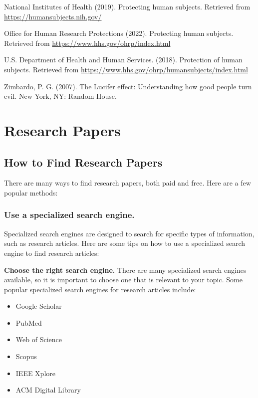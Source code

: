 \documentclass[
  b5paper]{book}
\begin{document}
National Institutes of Health (2019). Protecting human subjects. Retrieved from \url{https://humansubjects.nih.gov/}

Office for Human Research Protections (2022). Protecting human subjects. Retrieved from \url{https://www.hhs.gov/ohrp/index.html}

U.S. Department of Health and Human Services. (2018). Protection of human subjects. Retrieved from \url{https://www.hhs.gov/ohrp/humansubjects/index.html}

Zimbardo, P. G. (2007). The Lucifer effect: Understanding how good people turn evil. New York, NY: Random House.

\hypertarget{research-papers-1}{%
\chapter{Research Papers}\label{research-papers-1}}

\hypertarget{find}{%
\section{How to Find Research Papers}\label{find}}

There are many ways to find research papers, both paid and free. Here are a few popular methods:

\hypertarget{use-a-specialized-search-engine.}{%
\subsection*{Use a specialized search engine.}\label{use-a-specialized-search-engine.}}

Specialized search engines are designed to search for specific types of information, such as research articles. Here are some tips on how to use a specialized search engine to find research articles:

\textbf{Choose the right search engine.} There are many specialized search engines available, so it is important to choose one that is relevant to your topic. Some popular specialized search engines for research articles include:

\begin{itemize}
\item
  Google Scholar
\item
  PubMed
\item
  Web of Science
\item
  Scopus
\item
  IEEE Xplore
\item
  ACM Digital Library
\end{itemize}
\end{document}

